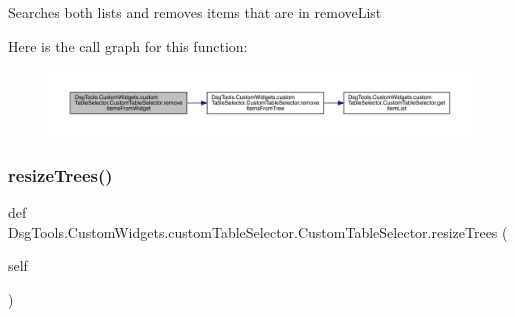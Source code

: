 \begin{DoxyVerb}Searches both lists and removes items that are in removeList
\end{DoxyVerb}
 Here is the call graph for this function\+:
\nopagebreak
\begin{figure}[H]
\begin{center}
\leavevmode
\includegraphics[width=350pt]{class_dsg_tools_1_1_custom_widgets_1_1custom_table_selector_1_1_custom_table_selector_aeb271b962b6d72639c03fe4887cc73f9_cgraph}
\end{center}
\end{figure}
\mbox{\label{class_dsg_tools_1_1_custom_widgets_1_1custom_table_selector_1_1_custom_table_selector_af85287115718bf9b8747eb7385d70a7a}} 
\subsubsection{\texorpdfstring{resize\+Trees()}{resizeTrees()}}
{\footnotesize\ttfamily def Dsg\+Tools.\+Custom\+Widgets.\+custom\+Table\+Selector.\+Custom\+Table\+Selector.\+resize\+Trees (\begin{DoxyParamCaption}\item[{}]{self }\end{DoxyParamCaption})}

